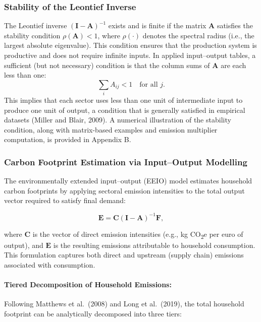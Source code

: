 \documentclass[12pt,a4paper]{article}%
\begin{document}
\subsubsection{Stability of the Leontief Inverse}

The Leontief inverse \( {(\mathbf{I} - \mathbf{A})}^{-1} \) exists and is finite if the matrix \( \mathbf{A} \) satisfies the stability condition \( \rho(\mathbf{A}) < 1 \), where \( \rho(\cdot) \) denotes the spectral radius (i.e., the largest absolute eigenvalue). This condition ensures that the production system is productive and does not require infinite inputs. In applied input--output tables, a sufficient (but not necessary) condition is that the column sums of \( \mathbf{A} \) are each less than one:
\[
\sum_i A_{ij} < 1 \quad \text{for all } j.
\]
This implies that each sector uses less than one unit of intermediate input to produce one unit of output, a condition that is generally satisfied in empirical datasets (Miller and Blair, 2009). A numerical illustration of the stability condition, along with matrix-based examples and emission multiplier computation, is provided in Appendix B.

\subsubsection{Carbon Footprint Estimation via Input–Output Modelling}

The environmentally extended input–output (EEIO) model estimates household carbon footprints by applying sectoral emission intensities to the total output vector required to satisfy final demand:

\begin{equation}
\mathbf{E} = \mathbf{C} {(\mathbf{I} - \mathbf{A})}^{-1} \mathbf{F},
\end{equation}

where \( \mathbf{C} \) is the vector of direct emission intensities (e.g., kg CO\textsubscript{2}e per euro of output), and \( \mathbf{E} \) is the resulting emissions attributable to household consumption. This formulation captures both direct and upstream (supply chain) emissions associated with consumption.

\paragraph{Tiered Decomposition of Household Emissions:}

Following Matthews et al.~(2008) and Long et al.~(2019), the total household footprint can be analytically decomposed into three tiers:
\end{document}
